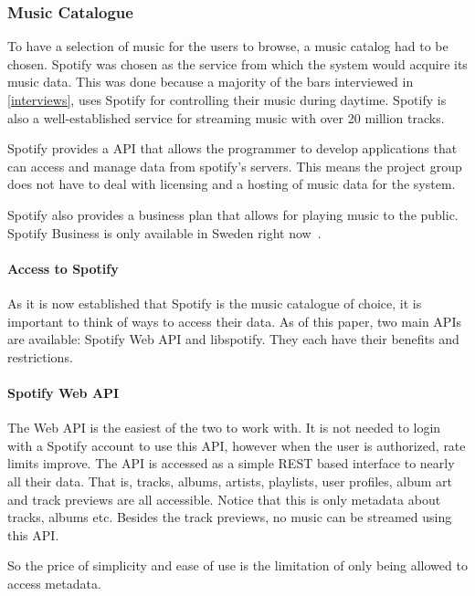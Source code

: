 \subsubsection{Music Catalogue}
\label{ssub:Music_catalog}
To have a selection of music for the users to browse, a music catalog had to be chosen. Spotify was chosen as the service from which the system would acquire its music data. This was done because a majority of the bars interviewed in \cref{interviews}, uses Spotify for controlling their music during daytime. Spotify is also a well-established service for streaming music with over 20 million tracks.

Spotify provides a API that allows the programmer to develop applications that can access and manage data from spotify’s servers. This means the project group does not have to deal with licensing and a hosting of music data for the system.

Spotify also provides a business plan that allows for playing music to the public. Spotify Business is only available in Sweden right now~\cite{spotifyBusiness}.

\paragraph{Access to Spotify}
\label{par:Access_to_Spotify}

As it is now established that Spotify is the music catalogue of choice, it is important to think of ways to access their data. As of this paper, two main APIs are available: Spotify Web API and libspotify. They each have their benefits and restrictions.

\paragraph{Spotify Web API}
\label{par:spotify_web_api}

The Web API is the easiest of the two to work with. It is not needed to login with a Spotify account to use this API, however when the user is authorized, rate limits improve. The API is accessed as a simple REST based interface to nearly all their data. That is, tracks, albums, artists, playlists, user profiles, album art and track previews are all accessible. Notice that this is only metadata about tracks, albums etc. Besides the track previews, no music can be streamed using this API.

So the price of simplicity and ease of use is the limitation of only being allowed to access metadata.

